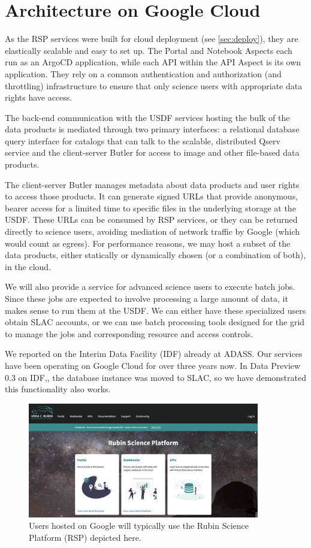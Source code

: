 \section{Architecture on Google Cloud} \label{sec:google}

As the RSP services were built for cloud deployment (see \autoref{sec:deploy}), they are elastically scalable and easy to set up.
The Portal and Notebook Aspects each run as an ArgoCD application, while each API within the API Aspect is its own application.
They rely on a common authentication and authorization (and throttling) infrastructure to ensure that only science users with appropriate data rights have access.

The back-end communication with the USDF services hosting the bulk of the data products is mediated through two primary interfaces: a relational database query interface for catalogs that can talk to the scalable, distributed Qserv service\cite{2011Wang:2011:QDS:2063348.2063364, DMTN-243} and the client-server Butler\cite{2024SPIE13101.129Jtmp,2022SPIE12189E..11J} for access to image and other file-based data products.

The client-server Butler manages metadata about data products and user rights to access those products.
It can generate signed URLs that provide anonymous, bearer access for a limited time to specific files in the underlying storage at the USDF.
These URLs can be consumed by RSP services, or they can be returned directly to science users, avoiding mediation of network traffic by Google (which would count as egress).
For performance reasons, we may host a subset of the data products, either statically or dynamically chosen (or a combination of both), in the cloud.

We will also provide a service for advanced science users to execute batch jobs.
Since these jobs are expected to involve processing a large amount of data, it makes sense to run them at the USDF.
We can either have these specialized users obtain SLAC accounts, or we can use batch processing tools designed for the grid to manage the jobs and corresponding resource and access controls.

We reported on the Interim Data Facility (IDF) already at ADASS\cite{2021arXiv211115030O}.
Our services have been operating on Google Cloud for over three years now.
In Data Preview 0.3 on IDF,\cite{RTN-050}, the database instance was moved to SLAC, so we have demonstrated this functionality also works.


\begin{figure}
\begin{centering}
\includegraphics[width=0.9\textwidth]{RSP.png}
	\caption{ Users hosted on Google will typically use the Rubin Science Platform (RSP) depicted here.  \label{fig:rsp}}
\end{centering}
\end{figure}
